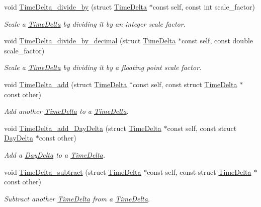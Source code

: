 \begin{DoxyCompactItemize}
void \hyperlink{time-delta_8h_abab39f5630f78511f708765da0be8632}{\-Time\-Delta\-\_\-divide\-\_\-by} (struct \hyperlink{structTimeDelta}{\-Time\-Delta} $\ast$const self, const int scale\-\_\-factor)
\begin{DoxyCompactList}\small\item\em \-Scale a \hyperlink{structTimeDelta}{\-Time\-Delta} by dividing it by an integer scale factor. \end{DoxyCompactList}\item 
void \hyperlink{time-delta_8h_acca21ee20d4addbd3925461259f4f12a}{\-Time\-Delta\-\_\-divide\-\_\-by\-\_\-decimal} (struct \hyperlink{structTimeDelta}{\-Time\-Delta} $\ast$const self, const double scale\-\_\-factor)
\begin{DoxyCompactList}\small\item\em \-Scale a \hyperlink{structTimeDelta}{\-Time\-Delta} by dividing it by a floating point scale factor. \end{DoxyCompactList}\item 
void \hyperlink{time-delta_8h_a388c9982a85d4f02741d4905fc8c3a1b}{\-Time\-Delta\-\_\-add} (struct \hyperlink{structTimeDelta}{\-Time\-Delta} $\ast$const self, const struct \hyperlink{structTimeDelta}{\-Time\-Delta} $\ast$const other)
\begin{DoxyCompactList}\small\item\em \-Add another \hyperlink{structTimeDelta}{\-Time\-Delta} to a \hyperlink{structTimeDelta}{\-Time\-Delta}. \end{DoxyCompactList}\item 
void \hyperlink{time-delta_8h_a80aa67e85468bf70b53e1eecd3f3e4cd}{\-Time\-Delta\-\_\-add\-\_\-\-Day\-Delta} (struct \hyperlink{structTimeDelta}{\-Time\-Delta} $\ast$const self, const struct \hyperlink{structDayDelta}{\-Day\-Delta} $\ast$const other)
\begin{DoxyCompactList}\small\item\em \-Add a \hyperlink{structDayDelta}{\-Day\-Delta} to a \hyperlink{structTimeDelta}{\-Time\-Delta}. \end{DoxyCompactList}\item 
void \hyperlink{time-delta_8h_aabc9864d36d4b617bccd6af5baba8fa2}{\-Time\-Delta\-\_\-subtract} (struct \hyperlink{structTimeDelta}{\-Time\-Delta} $\ast$const self, const struct \hyperlink{structTimeDelta}{\-Time\-Delta} $\ast$const other)
\begin{DoxyCompactList}\small\item\em \-Subtract another \hyperlink{structTimeDelta}{\-Time\-Delta} from a \hyperlink{structTimeDelta}{\-Time\-Delta}. \end{DoxyCompactList}\item 

\end{DoxyCompactItemize}
